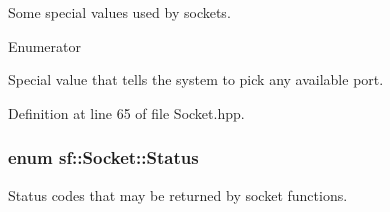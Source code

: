 Some special values used by sockets. 

\begin{Desc}
\item[Enumerator]\par
\begin{description}
\item[{\em 
\hypertarget{classsf_1_1_socket_a1b900779ad24d3604a4a000e2e38f372a5a3c30fd128895403afc11076f461b19}{Any\-Port}\label{classsf_1_1_socket_a1b900779ad24d3604a4a000e2e38f372a5a3c30fd128895403afc11076f461b19}
}]Special value that tells the system to pick any available port. \end{description}
\end{Desc}


Definition at line 65 of file Socket.\-hpp.

\hypertarget{classsf_1_1_socket_a51bf0fd51057b98a10fbb866246176dc}{
\subsubsection[{Status}]{\setlength{\rightskip}{0pt plus 5cm}enum {\bf sf\-::\-Socket\-::\-Status}}}\label{classsf_1_1_socket_a51bf0fd51057b98a10fbb866246176dc}


Status codes that may be returned by socket functions. 

